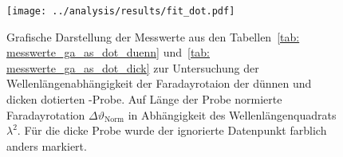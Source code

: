 \begin{figure}
\centering
\texttt{[image: ../analysis/results/fit\_dot.pdf]}
\caption{Grafische Darstellung der Messwerte aus den Tabellen~\ref{tab: messwerte_ga_as_dot_duenn} und~\ref{tab: messwerte_ga_as_dot_dick} 
zur Untersuchung der 
Wellenlängenabhängigkeit der Faradayrotaion der dünnen und dicken dotierten -Probe. Auf Länge der Probe normierte 
Faradayrotation $\Delta \vartheta_{\text{Norm}}$ in Abhängigkeit des Wellenlängenquadrats $\lambda^2$. Für die dicke Probe 
wurde der ignorierte Datenpunkt farblich anders markiert.}
\label{fig: ga_as_dot}
\end{figure}